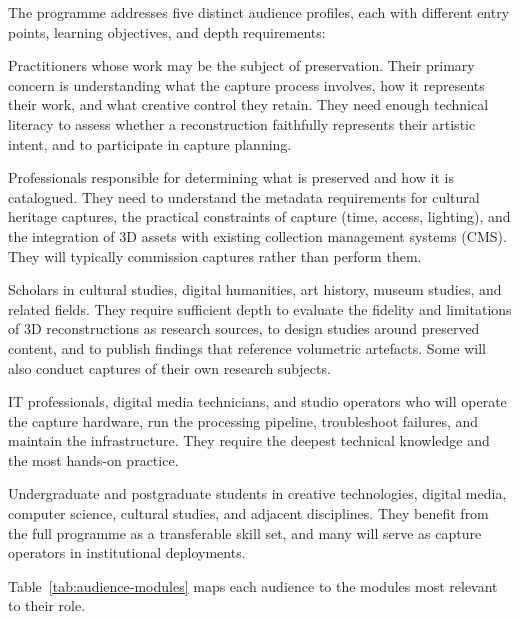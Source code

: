The programme addresses five distinct audience profiles, each with different entry points, learning objectives, and depth requirements:

\begin{description}[style=nextline]
  \item[Artists and Creators]
    Practitioners whose work may be the subject of preservation. Their primary concern is understanding what the capture process involves, how it represents their work, and what creative control they retain. They need enough technical literacy to assess whether a reconstruction faithfully represents their artistic intent, and to participate in capture planning.

  \item[Curators and Collection Managers]
    Professionals responsible for determining what is preserved and how it is catalogued. They need to understand the metadata requirements for cultural heritage captures, the practical constraints of capture (time, access, lighting), and the integration of 3D assets with existing collection management systems (CMS). They will typically commission captures rather than perform them.

  \item[Academic Researchers]
    Scholars in cultural studies, digital humanities, art history, museum studies, and related fields. They require sufficient depth to evaluate the fidelity and limitations of 3D reconstructions as research sources, to design studies around preserved content, and to publish findings that reference volumetric artefacts. Some will also conduct captures of their own research subjects.

  \item[Technical Staff]
    IT professionals, digital media technicians, and studio operators who will operate the capture hardware, run the processing pipeline, troubleshoot failures, and maintain the infrastructure. They require the deepest technical knowledge and the most hands-on practice.

  \item[Students]
    Undergraduate and postgraduate students in creative technologies, digital media, computer science, cultural studies, and adjacent disciplines. They benefit from the full programme as a transferable skill set, and many will serve as capture operators in institutional deployments.
\end{description}

Table~\ref{tab:audience-modules} maps each audience to the modules most relevant to their role.

